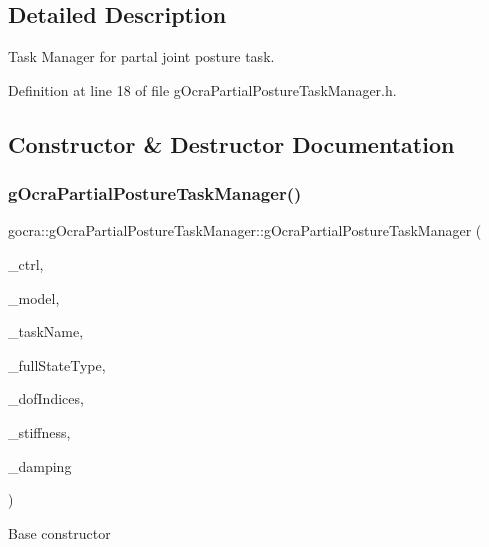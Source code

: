 \subsection{Detailed Description}
Task Manager for partal joint posture task. 



Definition at line 18 of file g\+Ocra\+Partial\+Posture\+Task\+Manager.\+h.



\subsection{Constructor \& Destructor Documentation}
\hypertarget{classgocra_1_1gOcraPartialPostureTaskManager_afd597f38d4ee2dfb05606959bf90757f}{}\label{classgocra_1_1gOcraPartialPostureTaskManager_afd597f38d4ee2dfb05606959bf90757f} 
\subsubsection{\texorpdfstring{g\+Ocra\+Partial\+Posture\+Task\+Manager()}{gOcraPartialPostureTaskManager()}\hspace{0.1cm}{\footnotesize\ttfamily [1/2]}}
{\footnotesize\ttfamily gocra\+::g\+Ocra\+Partial\+Posture\+Task\+Manager\+::g\+Ocra\+Partial\+Posture\+Task\+Manager (\begin{DoxyParamCaption}\item[{\hyperlink{classgocra_1_1GHCJTController}{G\+H\+C\+J\+T\+Controller} \&}]{\+\_\+ctrl,  }\item[{const ocra\+::\+Model \&}]{\+\_\+model,  }\item[{const std\+::string \&}]{\+\_\+task\+Name,  }\item[{int}]{\+\_\+full\+State\+Type,  }\item[{Eigen\+::\+Vector\+Xi \&}]{\+\_\+dof\+Indices,  }\item[{double}]{\+\_\+stiffness,  }\item[{double}]{\+\_\+damping }\end{DoxyParamCaption})}

Base constructor


